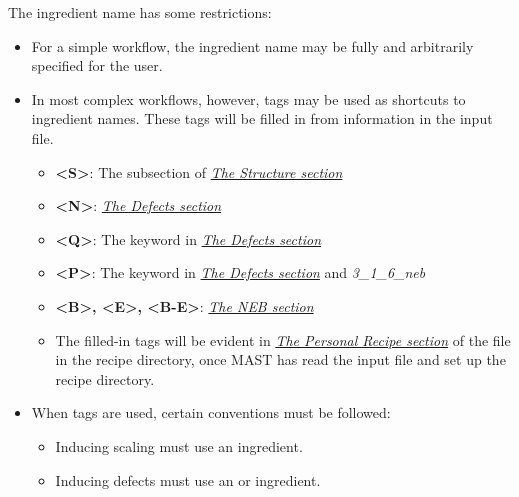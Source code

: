 \documentclass[letterpaper,10pt,english]{sphinxmanual}
\begin{document}
The ingredient name has some restrictions:
\begin{itemize}
\item {} 
For a simple workflow, the ingredient name may be fully and arbitrarily specified for the user.

\item {} 
In most complex workflows, however, tags may be used as shortcuts to ingredient names. These tags will be filled in from information in the input file.
\begin{itemize}
\item {} 
\textbf{\textless{}S\textgreater{}}: The  subsection of {\hyperref[3_1_1_structure::doc]{\emph{The Structure section}}}

\item {} 
\textbf{\textless{}N\textgreater{}}: {\hyperref[3_1_5_defects::doc]{\emph{The Defects section}}}

\item {} 
\textbf{\textless{}Q\textgreater{}}: The  keyword in {\hyperref[3_1_5_defects::doc]{\emph{The Defects section}}}

\item {} 
\textbf{\textless{}P\textgreater{}}: The  keyword in {\hyperref[3_1_5_defects::doc]{\emph{The Defects section}}} and \emph{3\_1\_6\_neb}

\item {} 
\textbf{\textless{}B\textgreater{}, \textless{}E\textgreater{}, \textless{}B-E\textgreater{}}: {\hyperref[3_1_6_neb::doc]{\emph{The NEB section}}}

\item {} 
The filled-in tags will be evident in {\hyperref[3_1_4_personalrecipe::doc]{\emph{The Personal Recipe section}}} of the  file in the recipe directory, once MAST has read the input file and set up the recipe directory.

\end{itemize}

\item {} 
When tags are used, certain conventions must be followed:
\begin{itemize}
\item {} 
Inducing scaling must use an  ingredient.

\item {} 
Inducing defects must use an  or  ingredient.


\end{itemize}
\end{itemize}
\end{document}
